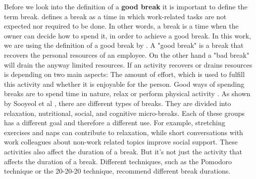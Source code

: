 \documentclass{hasel_thesis}
\begin{document}







Before we look into the definition of a \textbf{good break} it is important to define the term break. \cite{Trougakos.2009} defines a break as a time in which work-related tasks are not expected nor required to be done. In other words, a break is a time when the owner can decide how to spend it, in order to achieve a good break. In this work, we are using the definition of a good break by \cite{Trougakos.2009}. A "good break" is a break that recovers the personal resources of an employee. On the other hand a "bad break" will drain the anyway limited resources. If an activity recovers or drains resources is depending on two main aspects: The amount of effort, which is used to fulfill this activity and whether it is enjoyable for the person. Good ways of spending breaks are to spend time in nature, relax or perform physical activity \cite{Bloom.2014} \cite{Largo-Wight.2017}.  As shown by Sooyeol et al \cite{KimS.ParkY.&Niu.2017}, there are different types of breaks. They are divided into relaxation, nutritional, social, and cognitive micro-breaks. Each of these groups has a different goal and therefore a different use. For example, stretching exercises and naps can contribute to relaxation, while short conversations with work colleagues about non-work related topics improve social support. These activities also affect the duration of a break. But it's not just the activity that affects the duration of a break. Different techniques, such as the Pomodoro technique or the 20-20-20 technique, recommend different break durations.
\end{document}

